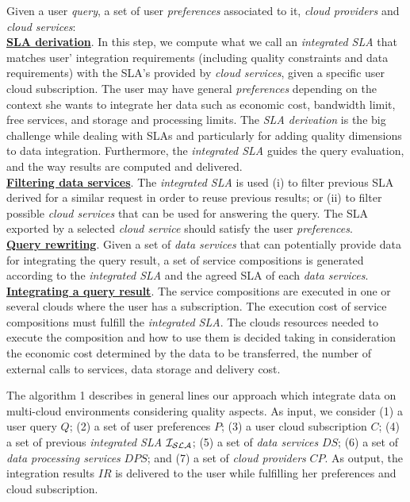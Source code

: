 Given a user \textit{query}, a set of user \textit{preferences} associated to it, \textit{cloud providers} and \textit{cloud services}:
\\
\textbf{\underline{SLA derivation}}. In this step, we compute what we call an \textsl{integrated SLA} that matches user' integration requirements (including quality constraints and data requirements) with the SLA's provided by \textit{cloud services}, given a specific user cloud subscription. The user may have general \textit{preferences} depending on the context she wants to integrate her data such as economic cost, bandwidth limit, free services, and storage and processing limits. The \textit{SLA derivation} is the big challenge while dealing with SLAs and particularly for adding quality dimensions to data integration. Furthermore, the \textsl{integrated SLA} guides the query evaluation, and the way results are computed and delivered. \\
\textbf{\underline{Filtering data services}}. The \textsl{integrated SLA} is used (i)
to filter previous SLA derived for a similar request in order to reuse previous results; or (ii) to filter possible \textit{cloud services} that can be used for answering the query. The SLA exported by a selected \textit{cloud service} should satisfy the user \textit{preferences}. \\
\textbf{\underline{Query rewriting}}. Given a set of \textit{data services} that can
potentially provide data for integrating the query result, a set of service compositions is generated according to the \textsl{integrated SLA} and the agreed SLA of each \textit{data services}. \\
\textbf{\underline{Integrating a query result}}. The service compositions are executed
in one or several clouds where the user has a subscription. The execution cost of service compositions must fulfill the \textsl{integrated SLA}. The clouds resources needed to execute the composition and how to use them is decided taking in consideration the economic cost determined by the data to be transferred, the number of external calls to services, data storage and delivery cost.

The algorithm 1 describes in general lines our approach which integrate data on multi-cloud environments considering quality aspects. 
%
As input, we consider (1) a user query $Q$; (2) a set of user preferences $P$; (3) a user cloud subscription $C$; (4) a set of previous \textit{integrated SLA} $\bigSLA$; (5) a set of \textit{data services} $DS$; (6) a set of \textit{data processing services} $DPS$; and (7) a set of \textit{cloud providers} $CP$. As output, the integration results $IR$ is delivered to the user while fulfilling her preferences and cloud subscription. 
%

